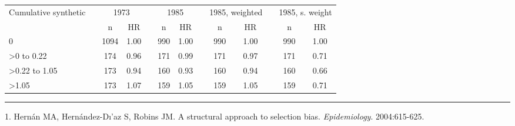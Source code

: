 \documentclass[10pt,]{article}
\begin{document}
\begin{table}[H]
\centering
\begin{tabular}{lcccccccccccc}
  \toprule
  Cumulative synthetic & &\multicolumn{2}{c}{1973} & &\multicolumn{2}{c}{1985} & &\multicolumn{2}{c}{1985, weighted} & &\multicolumn{2}{c}{1985, s. weight}\\
\cline{3-4}\cline{6-7}\cline{9-10}\cline{12-13}
&& n & HR&& n & HR&& n & HR&& n & HR\\ \midrule
0 &  & 1094 & 1.00 &  & 990 & 1.00 &  & 990 & 1.00 &  & 990 & 1.00 \\ 
  >0 to 0.22 &  & 174 & 0.96 &  & 171 & 0.99 &  & 171 & 0.97 &  & 171 & 0.71 \\ 
  >0.22 to 1.05 &  & 173 & 0.94 &  & 160 & 0.93 &  & 160 & 0.94 &  & 160 & 0.66 \\ 
  >1.05 &  & 173 & 1.07 &  & 159 & 1.05 &  & 159 & 1.05 &  & 159 & 0.71 \\ 
   \bottomrule
\end{tabular}
\end{table}

\begin{center}\rule{0.5\linewidth}{0.5pt}\end{center}

\hypertarget{refs}{}
\leavevmode\hypertarget{ref-Hernan_2004}{}%
1. Hernán MA, Hernández-Dı'az S, Robins JM. A structural approach to
selection bias. \emph{Epidemiology}. 2004:615-625.
\end{document}
